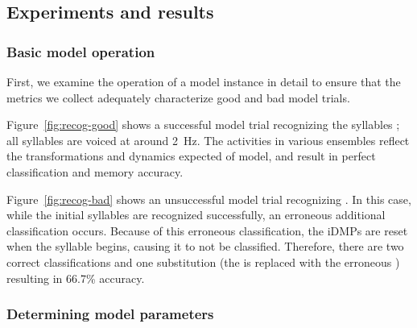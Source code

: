 \subsection{Experiments and results}

\subsubsection{Basic model operation}

First, we examine the operation
of a model instance in detail
to ensure that the metrics we collect
adequately characterize
good and bad model trials.

Figure~\ref{fig:recog-good} shows
a successful model trial
recognizing the syllables
;
all syllables are voiced
at around 2~Hz.
The activities in various ensembles
reflect the transformations
and dynamics expected of model,
and result in
perfect classification and memory accuracy.



Figure~\ref{fig:recog-bad}
shows an unsuccessful model trial
recognizing .
In this case, while the initial
\ipa{[blA ti]} syllables
are recognized successfully,
an erroneous additional
\ipa{[ti]} classification occurs.
Because of this erroneous classification,
the iDMPs are reset when
the \ipa{[dAs]} syllable begins,
causing it to not be classified.
Therefore, there are two correct
classifications and one substitution
(the \ipa{[dAs]} is replaced with the
erroneous \ipa{[ti]})
resulting in 66.7\% accuracy.

\subsubsection{Determining model parameters}

